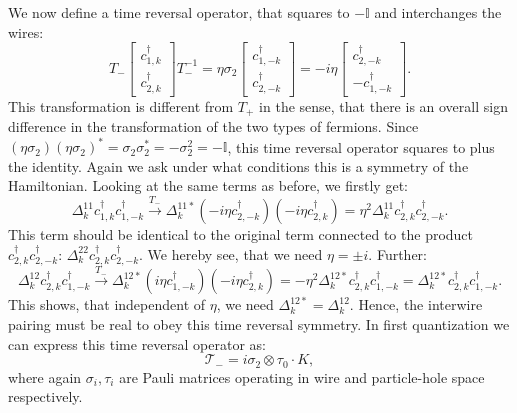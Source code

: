 We now define a time reversal operator, that squares to $-\mathbb{I}$ and interchanges the wires:
\begin{equation}
T_-\begin{bmatrix} c^\dagger_{1,k} \\ c^\dagger_{2,k} \end{bmatrix} T_-^{-1} = \eta\sigma_2 \begin{bmatrix} c^\dagger_{1,-k} \\ c^\dagger_{2,-k} \end{bmatrix} = -i\eta\begin{bmatrix} c^\dagger_{2,-k} \\ - c^\dagger_{1,-k} \end{bmatrix}.\nonumber
\end{equation} 
This transformation is different from $T_+$ in the sense, that there is an overall sign difference in the transformation of the two types of fermions. Since $(\eta \sigma_2)(\eta \sigma_2)^* = \sigma_2\sigma_2^* = - \sigma_2^2 = - \mathbb{I}$, this time reversal operator squares to plus the identity. Again we ask under what conditions this is a symmetry of the Hamiltonian. Looking at the same terms as before, we firstly get:
\begin{equation}
\Delta^{11}_k c^\dagger_{1,k}c^\dagger_{1,-k} \overset{T_-}{\to} \Delta^{11*}_k \left(-i\eta c^\dagger_{2,-k}\right)\left(-i\eta c^\dagger_{2,k}\right) = \eta^2\Delta^{11}_k c^\dagger_{2,k}c^\dagger_{2,-k}. \nonumber
\end{equation}
This term should be identical to the original term connected to the product $c^\dagger_{2,k}c^\dagger_{2,-k}$: $\Delta^{22}_k c^\dagger_{2,k}c^\dagger_{2,-k}$. We hereby see, that we need $\eta = \pm i$. Further:
\begin{equation}
\Delta^{12}_k c^\dagger_{2,k}c^\dagger_{1,-k} \overset{T_-}{\to} \Delta^{12*}_k \left(i\eta c^\dagger_{1,-k}\right)\left(-i\eta c^\dagger_{2,k}\right) = -\eta^2 \Delta^{12*}_k c^\dagger_{2,k}c^\dagger_{1,-k} = \Delta^{12*}_k c^\dagger_{2,k}c^\dagger_{1,-k}. \nonumber
\end{equation}
This shows, that independent of $\eta$, we need $\Delta^{12*}_k = \Delta^{12}_k$. Hence, the interwire pairing must be real to obey this time reversal symmetry. In first quantization we can express this time reversal operator as:
\begin{equation}
\mathcal{T}_- = i\sigma_2\otimes\tau_0 \cdot K, 
\label{eq.2wiresTminuswireexchangefirstquantization}
\end{equation}
where again $\sigma_i, \tau_i$ are Pauli matrices operating in wire and particle-hole space respectively. 

